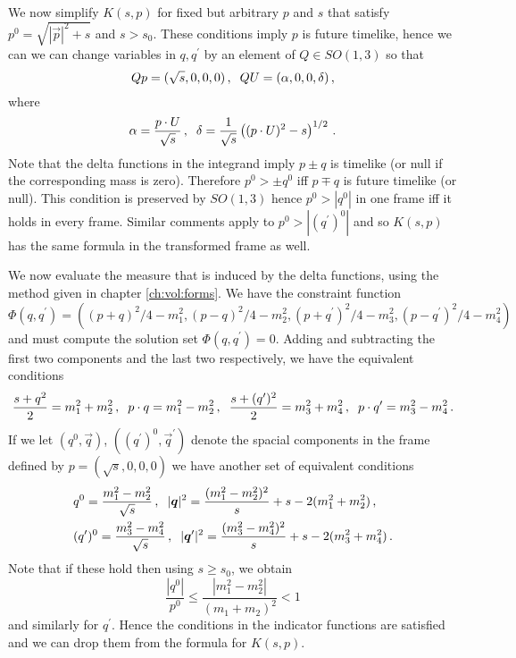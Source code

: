 We now simplify $K(s,p)$ for fixed but arbitrary $p$ and $s$ that satisfy $p^0=\sqrt{|\vec p|^2+s}$ and $s>s_0$.  These conditions imply $p$ is future timelike, hence we can we can change variables in  $q,q^{\prime}$ by an element of $Q\in SO(1,3)$ so that 
\begin{equation}
Qp=(\sqrt{s},0,0,0)\,, \hspace{2mm} QU=(\alpha,0,0,\delta)\,,
\end{equation}
where
\begin{equation}
\alpha=\frac{p\cdot U}{\sqrt{s}}\,, \hspace{2mm} \delta=\frac{1}{\sqrt{s}}\left((p\cdot U)^2-s \right)^{1/2}\,.
\end{equation}
Note that the delta functions in the integrand imply $p\pm q$ is  timelike (or null if the corresponding mass is zero).  Therefore $p^0>\pm q^0$ iff $p\mp q$ is future timelike (or null).  This condition is preserved by $SO(1,3)$ hence $p^0>|q^0|$ in one frame iff it holds in every frame.  Similar comments apply to $p^0>|(q^{\prime})^0|$ and so $K(s,p)$ has the same formula in the transformed frame as well.

We now evaluate the measure that is induced by the delta functions, using the method given in chapter \ref{ch:vol:forms}.  We have the constraint function
\begin{equation}
\Phi(q,q^{\prime})=((p+q)^2/4-m_1^2,(p-q)^2/4-m_2^2,(p+q^{\prime})^2/4-m_3^2,(p-q^{\prime})^2/4-m_4^2)
\end{equation}
and must compute the solution set $\Phi(q,q^{\prime})=0$. Adding and subtracting the first two components and the last two respectively, we have the equivalent conditions
\begin{align}
\frac{s+q^2}{2}=m_1^2+m_2^2\,,\hspace{2mm} p\cdot q=m_1^2-m_2^2\,, \hspace{2mm}\frac{s+(q^{\prime})^2}{2}=m_3^2+m_4^2\,,\hspace{2mm} p\cdot q^{\prime}=m_3^2-m_4^2\,.
\end{align}
If we let $(q^0,\vec{q})$, $((q^{\prime})^0,\vec{q}^{\prime})$ denote the spacial components in the frame defined by $p=(\sqrt{s},0,0,0)$ we have another set of equivalent conditions
\begin{align}\label{coordConditions}
&q^{0}=\frac{m_1^2-m_2^2}{\sqrt{s}}\,,\hspace{2mm} |\vec{q}|^2=\frac{(m_1^2-m_2^2)^2}{s}+s-2(m_1^2+m_2^2)\,,\\
&(q^{\prime})^{0}=\frac{m_3^2-m_4^2}{\sqrt{s}}\,, \hspace{2mm} |\vec{q}^{\prime}|^2=\frac{(m_3^2-m_4^2)^2}{s}+s-2(m_3^2+m_4^2)\,.\notag
\end{align}
Note that if these hold then using $s\geq s_0$, we obtain
\begin{equation}
\frac{|q^0|}{p^0}\leq \frac{|m_1^2-m_2^2|}{(m_1+m_2)^2}<1
\end{equation}
and similarly for $q^{\prime}$.  Hence the conditions in the indicator functions are satisfied and we can drop them from the formula for $K(s,p)$.

